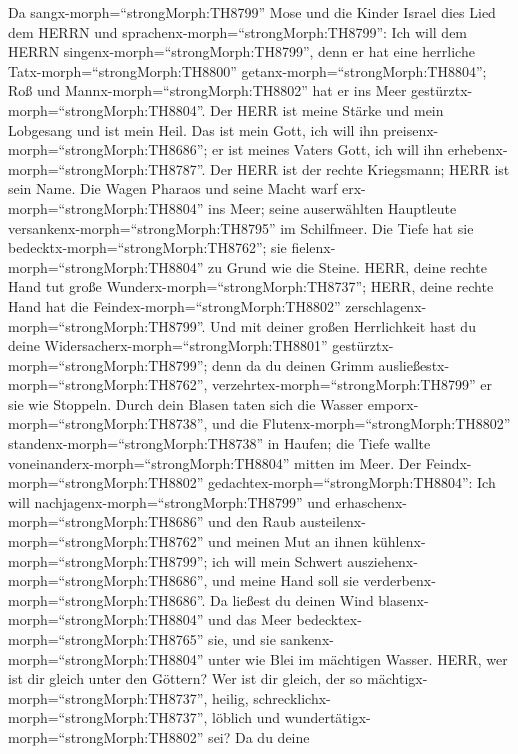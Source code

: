  Da sangx-morph=``strongMorph:TH8799'' Mose und die Kinder
Israel dies Lied dem HERRN und sprachenx-morph=``strongMorph:TH8799'':
Ich will dem HERRN singenx-morph=``strongMorph:TH8799'', denn er hat
eine herrliche Tatx-morph=``strongMorph:TH8800''
getanx-morph=``strongMorph:TH8804''; Roß und
Mannx-morph=``strongMorph:TH8802'' hat er ins Meer
gestürztx-morph=``strongMorph:TH8804''.  Der HERR ist meine
Stärke und mein Lobgesang und ist mein Heil. Das ist mein Gott, ich will
ihn preisenx-morph=``strongMorph:TH8686''; er ist meines Vaters Gott,
ich will ihn erhebenx-morph=``strongMorph:TH8787''.  Der
HERR ist der rechte Kriegsmann; HERR ist sein Name.  Die
Wagen Pharaos und seine Macht warf erx-morph=``strongMorph:TH8804'' ins
Meer; seine auserwählten Hauptleute
versankenx-morph=``strongMorph:TH8795'' im Schilfmeer.  Die
Tiefe hat sie bedecktx-morph=``strongMorph:TH8762''; sie
fielenx-morph=``strongMorph:TH8804'' zu Grund wie die Steine.
 HERR, deine rechte Hand tut große
Wunderx-morph=``strongMorph:TH8737''; HERR, deine rechte Hand hat die
Feindex-morph=``strongMorph:TH8802''
zerschlagenx-morph=``strongMorph:TH8799''.  Und mit deiner
großen Herrlichkeit hast du deine
Widersacherx-morph=``strongMorph:TH8801''
gestürztx-morph=``strongMorph:TH8799''; denn da du deinen Grimm
ausließestx-morph=``strongMorph:TH8762'',
verzehrtex-morph=``strongMorph:TH8799'' er sie wie Stoppeln.
 Durch dein Blasen taten sich die Wasser
emporx-morph=``strongMorph:TH8738'', und die
Flutenx-morph=``strongMorph:TH8802''
standenx-morph=``strongMorph:TH8738'' in Haufen; die Tiefe wallte
voneinanderx-morph=``strongMorph:TH8804'' mitten im Meer. 
Der Feindx-morph=``strongMorph:TH8802''
gedachtex-morph=``strongMorph:TH8804'': Ich will
nachjagenx-morph=``strongMorph:TH8799'' und
erhaschenx-morph=``strongMorph:TH8686'' und den Raub
austeilenx-morph=``strongMorph:TH8762'' und meinen Mut an ihnen
kühlenx-morph=``strongMorph:TH8799''; ich will mein Schwert
ausziehenx-morph=``strongMorph:TH8686'', und meine Hand soll sie
verderbenx-morph=``strongMorph:TH8686''.  Da ließest du
deinen Wind blasenx-morph=``strongMorph:TH8804'' und das Meer
bedecktex-morph=``strongMorph:TH8765'' sie, und sie
sankenx-morph=``strongMorph:TH8804'' unter wie Blei im mächtigen Wasser.
 HERR, wer ist dir gleich unter den Göttern? Wer ist dir
gleich, der so mächtigx-morph=``strongMorph:TH8737'', heilig,
schrecklichx-morph=``strongMorph:TH8737'', löblich und
wundertätigx-morph=``strongMorph:TH8802'' sei?  Da du deine
